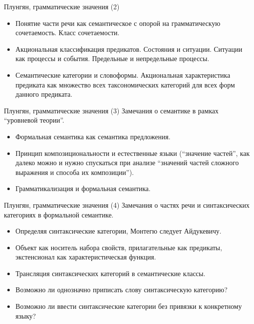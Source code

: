 \documentclass{beamer}
\begin{document}
\begin{frame}{Плунгян, грамматические значения (2)}
\begin{itemize}
  \item Понятие части речи как семантическое с опорой на грамматическую сочетаемость. Класс сочетаемости. 
  \item Акциональная классификация предикатов. Состояния и ситуации. Ситуации как процессы и события. Предельные и непредельные процессы.
  \item Семантические категории и словоформы. Акциональная характеристика предиката как множество всех таксономических категорий для всех форм данного предиката.
\end{itemize}
\end{frame}

\begin{frame}{Плунгян, грамматические значения (3)}
Замечания о семантике в рамках ``уровневой теории''.\\
\bigskip
\begin{itemize}
  \item Формальная семантика как семантика предложения.
  \item Принцип композициональности и естественные языки (``значение частей'', как далеко можно и нужно спускаться при анализе ``значений частей сложного выражения и способа их композиции'').
  \item Грамматикализация и формальная семантика.
\end{itemize}
\end{frame}

\begin{frame}{Плунгян, грамматические значения (4)}
Замечания о частях речи и синтаксических категориях в формальной семантике.\\
\bigskip
\begin{itemize}
  \item Определяя синтаксические категории, Монтегю следует Айдукевичу. 
  \item Объект как носитель набора свойств, прилагательные как предикаты, экстенсионал как характеристическая функция.
  \item Трансляция синтаксических категорий в семантические классы.
  \item Возможно ли однозначно приписать слову синтаксическую категорию?
  \item Возможно ли ввести синтаксические категории без привязки к конкретному языку?
\end{itemize}
\end{frame}
\end{document}
